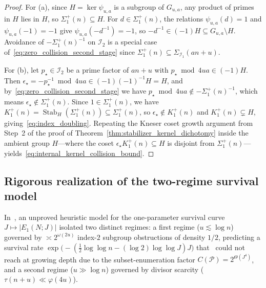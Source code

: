 \documentclass[11pt, a4paper]{article}
\theoremstyle{plain}
\theoremstyle{definition}
\begin{document}
\begin{proof}
For (a), since $H=\ker\psi_{u,a}$ is a subgroup of $G_{u,a}$, any product of primes in $H$ lies in $H$, so $\Sigma_1^{+}(n)\subseteq H$. For $d\in\Sigma_1^{+}(n)$, the relations $\psi_{u,a}(d)=1$ and $\psi_{u,a}(-1)=-1$ give $\psi_{u,a}(-d^{-1})=-1$, so $-d^{-1}\in(-1)H\subseteq G_{u,a}\setminus H$. Avoidance of $-\Sigma_1^{+}(n)^{-1}$ on $\mathcal{I}_2$ is a special case of~\eqref{eq:zero_collision_second_stage} since $\Sigma_1^{+}(n)\subseteq\Sigma_{\mathcal{I}_1}(an+u)$.

For (b), let $p_{\star}\in\mathcal{I}_2$ be a prime factor of $an+u$ with $p_{\star}\bmod 4ua\in(-1)H$. Then $\epsilon_{\star}=-p_{\star}^{-1}\bmod 4ua\in(-1)(-1)^{-1}H=H$, and by~\eqref{eq:zero_collision_second_stage} we have $p_{\star}\bmod 4ua\notin-\Sigma_1^{+}(n)^{-1}$, which means $\epsilon_{\star}\notin\Sigma_1^{+}(n)$. Since $1\in\Sigma_1^{+}(n)$, we have $K_1^{+}(n)=\operatorname{Stab}_H(\Sigma_1^{+}(n))\subseteq\Sigma_1^{+}(n)$, so $\epsilon_{\star}\notin K_1^{+}(n)$ and $K_1^{+}(n)\subsetneq H$, giving~\eqref{eq:index_doubling}. Repeating the Kneser coset growth argument from Step~2 of the proof of Theorem~\ref{thm:stabilizer_kernel_dichotomy} inside the ambient group $H$—where the coset $\epsilon_{\star}K_1^{+}(n)\subseteq H$ is disjoint from $\Sigma_1^{+}(n)$—yields~\eqref{eq:internal_kernel_collision_bound}.
\end{proof}

\subsection{Rigorous realization of the two-regime survival model}\label{subsec:rigorous_bridge_heuristic}

In~\cite[\S4.5]{dahan2026a}, an unproved heuristic model for the one-parameter survival curve $J\mapsto|E_1(N;J)|$ isolated two distinct regimes: a first regime ($u\lesssim\log n$) governed by $\asymp 2^{\omega(2u)}$ index-$2$ subgroup obstructions of density $1/2$, predicting a survival rate $\exp\big(-(\frac12\log\log n-(\log 2)\log\log J)J\big)$ that~\cite[Theorem~4.3]{dahan2026a} could not reach at growing depth due to the subset-enumeration factor $C(\mathcal{P})=2^{\Theta(J^{4})}$, and a second regime ($u\gg\log n$) governed by divisor scarcity ($\tau(n+u)\ll\varphi(4u)$).
\end{document}
